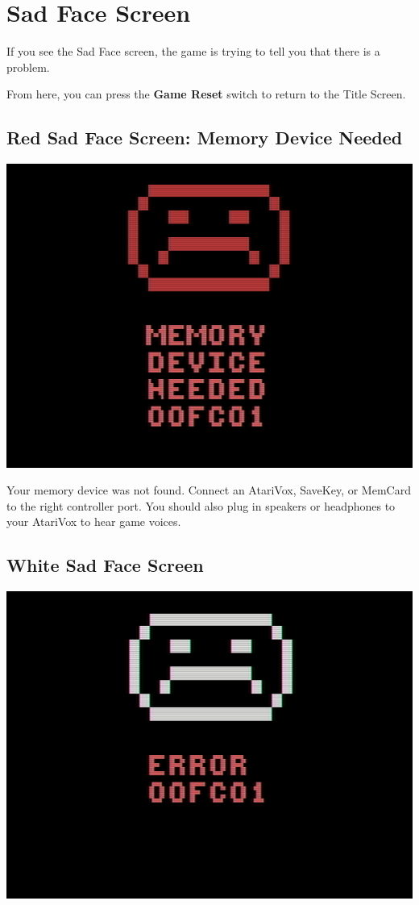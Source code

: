 \documentclass[9pt,twocolumn,openany,article]{memoir}
\begin{document}
\fi

\section*{Sad Face Screen}

If you  see the Sad  Face screen,  the game is  trying to tell  you that
there is a problem.

From here, you can press the \textbf{Game Reset} switch to return to the
Title Screen.

\ifdefined\ATARIAGESAVE\else\ifdefined\NOSAVE\else

\subsection{Red Sad Face Screen: Memory Device Needed}

\includegraphics[width=\columnwidth]{../Manual/RedSadFaceNTSC.png}

Your  memory device  was not  found.  Connect an  AtariVox, SaveKey,  or
MemCard to the  right controller port. You should also  plug in speakers
or headphones to your AtariVox to hear game voices.

\fi\fi

\subsection{White Sad Face Screen}

\includegraphics[width=.75\columnwidth]{../Manual/WhiteSadFaceNTSC.png}
\end{document}
